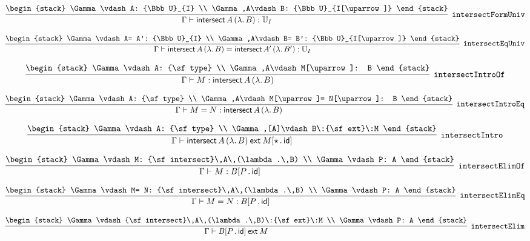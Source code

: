 \[
\infer[{\tt intersectFormUniv}]{\Gamma \vdash {\sf intersect}\,A\,(\lambda .\,B): {\Bbb U}_{I}}{
\begin{stack}
\Gamma \vdash A: {\Bbb U}_{I}
\\
\Gamma ,A\vdash B: {\Bbb U}_{I[\uparrow ]}
\end{stack}}
\]

\[
\infer[{\tt intersectEqUniv}]{\Gamma \vdash {\sf intersect}\,A\,(\lambda .\,B)= {\sf intersect}\,A'\,(\lambda .\,B'): {\Bbb U}_{I}}{
\begin{stack}
\Gamma \vdash A= A': {\Bbb U}_{I}
\\
\Gamma ,A\vdash B= B': {\Bbb U}_{I[\uparrow ]}
\end{stack}}
\]

\[
\infer[{\tt intersectIntroOf}]{\Gamma \vdash M: {\sf intersect}\,A\,(\lambda .\,B)}{
\begin{stack}
\Gamma \vdash A: {\sf type}
\\
\Gamma ,A\vdash M[\uparrow ]: B
\end{stack}}
\]

\[
\infer[{\tt intersectIntroEq}]{\Gamma \vdash M= N: {\sf intersect}\,A\,(\lambda .\,B)}{
\begin{stack}
\Gamma \vdash A: {\sf type}
\\
\Gamma ,A\vdash M[\uparrow ]= N[\uparrow ]: B
\end{stack}}
\]

\[
\infer[{\tt intersectIntro}]{\Gamma \vdash {\sf intersect}\,A\,(\lambda .\,B)\:{\sf ext}\:M[\star \,.\,{\sf id}]}{
\begin{stack}
\Gamma \vdash A: {\sf type}
\\
\Gamma ,[A]\vdash B\:{\sf ext}\:M
\end{stack}}
\]

\[
\infer[{\tt intersectElimOf}]{\Gamma \vdash M: B[P\,.\,{\sf id}]}{
\begin{stack}
\Gamma \vdash M: {\sf intersect}\,A\,(\lambda .\,B)
\\
\Gamma \vdash P: A
\end{stack}}
\]

\[
\infer[{\tt intersectElimEq}]{\Gamma \vdash M= N: B[P\,.\,{\sf id}]}{
\begin{stack}
\Gamma \vdash M= N: {\sf intersect}\,A\,(\lambda .\,B)
\\
\Gamma \vdash P: A
\end{stack}}
\]

\[
\infer[{\tt intersectElim}]{\Gamma \vdash B[P\,.\,{\sf id}]\:{\sf ext}\:M}{
\begin{stack}
\Gamma \vdash {\sf intersect}\,A\,(\lambda .\,B)\:{\sf ext}\:M
\\
\Gamma \vdash P: A
\end{stack}}
\]

